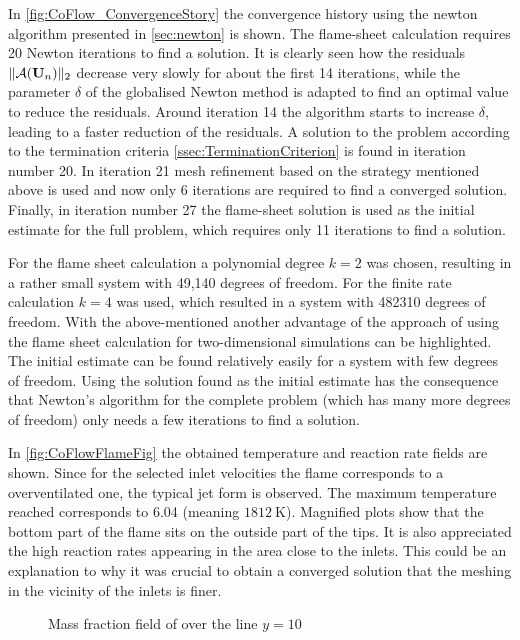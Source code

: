 In \cref{fig:CoFlow_ConvergenceStory} the convergence history using the newton algorithm presented in \cref{sec:newton} is shown. The flame-sheet calculation requires 20 Newton iterations to find a solution. It is clearly seen how the residuals $\| \mathcal{A}(\textbf{U}_{n}) \|_2 $  decrease very slowly for about the first 14 iterations, while the parameter $\delta$ of the globalised Newton method is adapted to find an optimal value to reduce the residuals. Around iteration 14 the algorithm starts to increase $\delta$, leading to a faster reduction of the residuals. A solution to the problem according to the termination criteria \cref{ssec:TerminationCriterion} is found in iteration number 20. In iteration 21 mesh refinement based on the strategy mentioned above is used and now only 6 iterations are required to find a converged solution. Finally, in iteration number 27 the flame-sheet solution is used as the initial estimate for the full problem, which requires only 11 iterations to find a solution.  

For the flame sheet calculation a polynomial degree $k = 2$ was chosen, resulting in a rather small system with 49,140 degrees of freedom. For the finite rate calculation $k = 4$ was used, which resulted in a system with 482310 degrees of freedom.  With the above-mentioned another advantage of the approach of using the flame sheet calculation for two-dimensional simulations can be highlighted. The initial estimate can be found relatively easily for a system with few degrees of freedom. Using the solution found as the initial estimate has the consequence that Newton's algorithm for the complete problem (which has many more degrees of freedom) only needs a few iterations to find a solution.

In \cref{fig:CoFlowFlameFig} the obtained temperature and reaction rate fields are shown. Since for the selected inlet velocities the flame corresponds to a overventilated one, the typical jet form is observed. The maximum temperature reached corresponds to 6.04 (meaning $\SI{1812}{\kelvin}$). Magnified plots show that the bottom part of the flame sits on the outside part of the tips. It is also appreciated the high reaction rates appearing in the area close to the inlets. This could be an explanation to why it was crucial  to obtain a converged solution that the meshing in the vicinity of the inlets is finer.

\begin{figure}[h]
	\centering
	\pgfplotsset{width=0.6\textwidth, compat=1.3}
		\caption{Mass fraction field of   over the line $y = 10$}
		\label{fig:CoFlowMF3_infiniteFinite}
	\end{figure}


